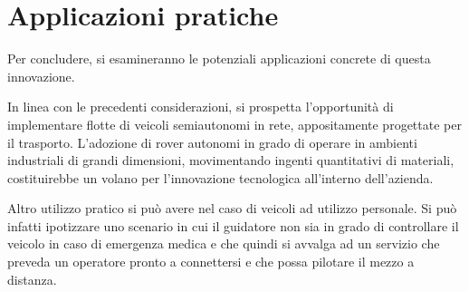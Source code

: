 \section{Applicazioni pratiche}
Per concludere, si esamineranno le potenziali applicazioni concrete di questa innovazione.

\noindent In linea con le precedenti considerazioni, si prospetta l'opportunità di implementare flotte di veicoli semiautonomi in rete, appositamente progettate per il trasporto. L'adozione di rover autonomi in grado di operare in ambienti industriali di grandi dimensioni, movimentando ingenti quantitativi di materiali, costituirebbe un volano per l'innovazione tecnologica all'interno dell'azienda.

\noindent Altro utilizzo pratico si può avere nel caso di veicoli ad utilizzo personale. Si può infatti ipotizzare uno scenario in cui il guidatore non sia in grado di controllare il veicolo in caso di emergenza medica e che quindi si avvalga ad un servizio che preveda un operatore pronto a connettersi e che possa pilotare il mezzo a distanza. 
